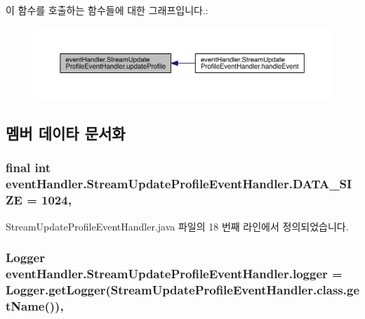 이 함수를 호출하는 함수들에 대한 그래프입니다.\+:\nopagebreak
\begin{figure}[H]
\begin{center}
\leavevmode
\includegraphics[width=350pt]{classevent_handler_1_1_stream_update_profile_event_handler_a888b80c6db463e195fe9ebefc39c721e_icgraph}
\end{center}
\end{figure}




\subsection{멤버 데이타 문서화}
\hypertarget{classevent_handler_1_1_stream_update_profile_event_handler_a217e02fac4843d50927e5ebcb97baf0f}{
\subsubsection[{D\+A\+T\+A\+\_\+\+S\+I\+Z\+E}]{\setlength{\rightskip}{0pt plus 5cm}final int event\+Handler.\+Stream\+Update\+Profile\+Event\+Handler.\+D\+A\+T\+A\+\_\+\+S\+I\+Z\+E = 1024\hspace{0.3cm}{\ttfamily [static]}, {\ttfamily [private]}}}\label{classevent_handler_1_1_stream_update_profile_event_handler_a217e02fac4843d50927e5ebcb97baf0f}


Stream\+Update\+Profile\+Event\+Handler.\+java 파일의 18 번째 라인에서 정의되었습니다.

\hypertarget{classevent_handler_1_1_stream_update_profile_event_handler_a90754ca06692e3fc5767403f29a567b8}{
\subsubsection[{logger}]{\setlength{\rightskip}{0pt plus 5cm}Logger event\+Handler.\+Stream\+Update\+Profile\+Event\+Handler.\+logger = Logger.\+get\+Logger(Stream\+Update\+Profile\+Event\+Handler.\+class.\+get\+Name())\hspace{0.3cm}{\ttfamily [static]}, {\ttfamily [private]}}}\label{classevent_handler_1_1_stream_update_profile_event_handler_a90754ca06692e3fc5767403f29a567b8}


